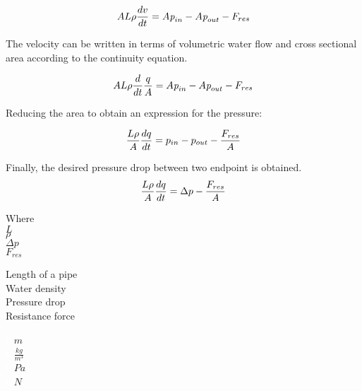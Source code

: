  \begin{equation}
    A L \rho \frac{dv}{dt} = A \textit{p}_{in} - A \textit{p}_{out} - F_{res} \\
\end{equation}

The velocity can be written in terms of volumetric water flow and cross sectional area according to the continuity 
equation.

\begin{equation}
    A L \rho \frac{d}{dt} \frac{q}{A} = A \textit{p}_{in} - A \textit{p}_{out} - F_{res} \\
\end{equation}

Reducing the area to obtain an expression for the pressure: 

\begin{equation}
    \frac{L \rho}{A} \frac{dq}{dt} =p_{in} - p_{out} - \frac{ F_{res}}{A} \\
\end{equation}

Finally, the desired pressure drop between two endpoint is obtained.
\begin{equation}
    \frac{L \rho}{A} \frac{dq}{dt} =\Delta p - \frac{ F_{res}}{A} \\
\end{equation}

\begin{minipage}[t]{0.20\textwidth}
Where\\
\hspace*{8mm} $L$ \\
\hspace*{8mm} $\rho$ \\
\hspace*{8mm} $\Delta p$ \\
\hspace*{8mm} $F_{res}$ 
\end{minipage}

\begin{minipage}[t]{0.68\textwidth}
\vspace*{2mm}
Length of a pipe\\
Water density\\
Pressure drop\\
Resistance force

\end{minipage}
\begin{minipage}[t]{0.10\textwidth}
\vspace*{2mm}
\textcolor{White}{te}$\unit{m}$\\
\textcolor{White}{te}$\unit{\frac{kg}{m^{3}}}$\\
\textcolor{White}{te}$\unit{Pa}$\\
\textcolor{White}{te}$\unit{N}$
\end{minipage}

